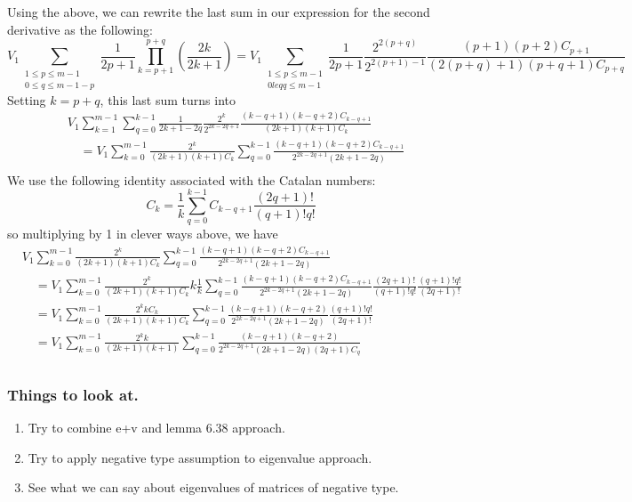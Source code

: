 \documentclass[11pt]{article}
\theoremstyle{definition}
\theoremstyle{definition}
\theoremstyle{plain}
\theoremstyle{plain}
\theoremstyle{plain}
\theoremstyle{definition}
\begin{document}
Using the above, we can rewrite the last sum in our expression for the second derivative as the following:
\begin{equation*}
V_{1}\sum\limits_{\substack{1\leq p \leq m-1 \\ 0 \leq q \leq m - 1 - p}}\frac{1}{2p+1}\prod\limits_{k=p+1}^{p+q}\left(\frac{2k}{2k+1}\right) = V_1\sum\limits_{\substack{1\leq p \leq m-1 \\ 0 leq q \leq m-1}} \frac{1}{2p+1}\frac{2^{2(p+q)}}{2^{2(p+1)-1}}\frac{(p+1)(p+2)C_{p+1}}{(2(p+q)+1)(p+q+1)C_{p+q}}
\end{equation*}
Setting $k = p+q$, this last sum turns into
\begin{align*}
&V_1\sum\limits_{k=1}^{m-1}\sum\limits_{q=0}^{k-1}\frac{1}{2k+1-2q}\frac{2^k}{2^{2k-2q+1}}\frac{(k-q+1)(k-q+2)C_{k-q+1}}{(2k+1)(k+1)C_k} \\
&\quad= V_1\sum\limits_{k=0}^{m-1}\frac{2^k}{(2k+1)(k+1)C_k}\sum\limits_{q=0}^{k-1}\frac{(k-q+1)(k-q+2)C_{k-q+1}}{2^{2k-2q+1}(2k+1-2q)} \\
\end{align*}
We use the following identity associated with the Catalan numbers:
\begin{equation*}
C_k = \frac{1}{k}\sum\limits_{q=0}^{k-1}C_{k-q+1}\frac{(2q+1)!}{(q+1)!q!}
\end{equation*}
so multiplying by 1 in clever ways above, we have
\begin{align*}
&V_1\sum\limits_{k=0}^{m-1}\frac{2^k}{(2k+1)(k+1)C_k}\sum\limits_{q=0}^{k-1}\frac{(k-q+1)(k-q+2)C_{k-q+1}}{2^{2k-2q+1}(2k+1-2q)} \\
&\quad=V_1\sum\limits_{k=0}^{m-1}\frac{2^k}{(2k+1)(k+1)C_k}k\frac{1}{k}\sum\limits_{q=0}^{k-1}\frac{(k-q+1)(k-q+2)C_{k-q+1}}{2^{2k-2q+1}(2k+1-2q)}\frac{(2q+1)!}{(q+1)!q!}\frac{(q+1)!q!}{(2q+1)!} \\
&\quad=V_1\sum\limits_{k=0}^{m-1}\frac{2^kkC_k}{(2k+1)(k+1)C_k}\sum\limits_{q=0}^{k-1}\frac{(k-q+1)(k-q+2)}{2^{2k-2q+1}(2k+1-2q)}\frac{(q+1)!q!}{(2q+1)!} \\
&\quad=V_1\sum\limits_{k=0}^{m-1}\frac{2^kk}{(2k+1)(k+1)}\sum\limits_{q=0}^{k-1}\frac{(k-q+1)(k-q+2)}{2^{2k-2q+1}(2k+1-2q)(2q+1)C_q} \\
\end{align*}

\pagebreak

\subsubsection*{Things to look at.}
\begin{enumerate}
\item Try to combine e+v and lemma 6.38 approach.
\item Try to apply negative type assumption to eigenvalue approach.
\item See what we can say about eigenvalues of matrices of negative type.
\end{enumerate}
\end{document}
